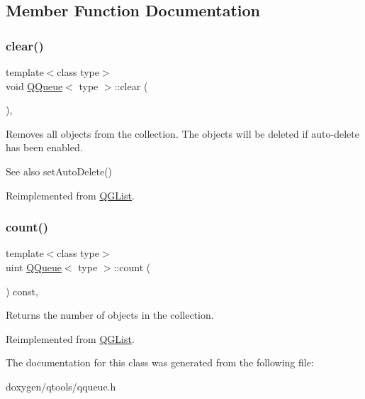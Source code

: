 \subsection{Member Function Documentation}
\mbox{\label{class_q_queue_a39841ee54f380f58fb96be30eb5e7c89}} 
\subsubsection{\texorpdfstring{clear()}{clear()}}
{\footnotesize\ttfamily template$<$class type$>$ \\
void \mbox{\hyperlink{class_q_queue}{Q\+Queue}}$<$ type $>$\+::clear (\begin{DoxyParamCaption}{ }\end{DoxyParamCaption})\hspace{0.3cm}{\ttfamily [inline]}, {\ttfamily [virtual]}}

Removes all objects from the collection. The objects will be deleted if auto-\/delete has been enabled. \begin{DoxySeeAlso}{See also}
set\+Auto\+Delete() 
\end{DoxySeeAlso}


Reimplemented from \mbox{\hyperlink{class_q_g_list_a9b89540497bfcf674466dcf9e343d981}{Q\+G\+List}}.

\mbox{\label{class_q_queue_aa01eca1beb057eb3055272a528e4ee01}} 
\subsubsection{\texorpdfstring{count()}{count()}}
{\footnotesize\ttfamily template$<$class type$>$ \\
uint \mbox{\hyperlink{class_q_queue}{Q\+Queue}}$<$ type $>$\+::count (\begin{DoxyParamCaption}{ }\end{DoxyParamCaption}) const\hspace{0.3cm}{\ttfamily [inline]}, {\ttfamily [virtual]}}

Returns the number of objects in the collection. 

Reimplemented from \mbox{\hyperlink{class_q_g_list_af765260057e85e575adff7fd9f25d062}{Q\+G\+List}}.



The documentation for this class was generated from the following file\+:\begin{DoxyCompactItemize}
\item 
doxygen/qtools/qqueue.\+h\end{DoxyCompactItemize}
